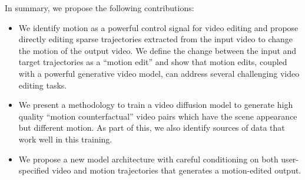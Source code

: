 In summary, we propose the following contributions:
\begin{itemize}
\item We identify motion as a powerful control signal for video editing and propose directly editing sparse trajectories extracted from the input video to change the motion of the output video. We define the change between the input and target trajectories as a ``motion edit'' and show that motion edits, coupled with a powerful generative video model, can address several challenging video editing tasks.
\item We present a methodology to train a video diffusion model to generate high quality ``motion counterfactual'' video pairs which have the scene appearance but different motion. As part of this, we also identify sources of data that work well in this training.
\item We propose a new model architecture with careful conditioning on both user-specified video and motion trajectories that generates a motion-edited output.
\end{itemize}

\label{mv2v_sec:intro}
\label{mv2v_sec:method}
